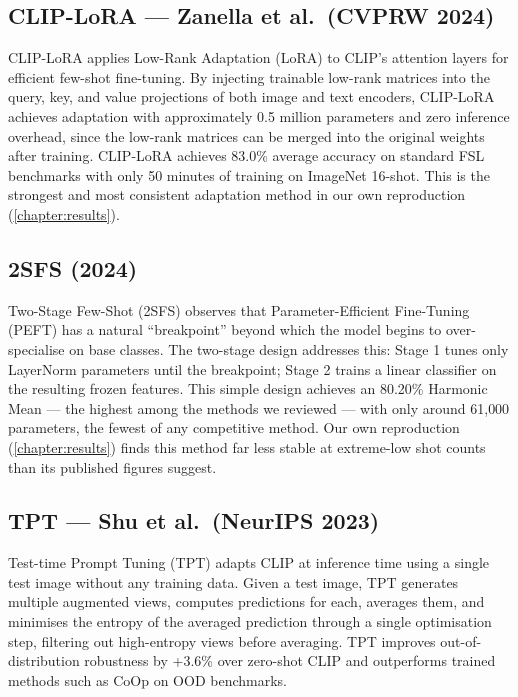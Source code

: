 \documentclass{iutbscthesis}
\begin{document}
\subsection{CLIP-LoRA --- Zanella et al.\ (CVPRW 2024)}
CLIP-LoRA \cite{zanella2024cliplora} applies Low-Rank Adaptation (LoRA) to CLIP's attention layers for efficient few-shot fine-tuning. By injecting trainable low-rank matrices into the query, key, and value projections of both image and text encoders, CLIP-LoRA achieves adaptation with approximately 0.5 million parameters and zero inference overhead, since the low-rank matrices can be merged into the original weights after training. CLIP-LoRA achieves 83.0\% average accuracy on standard FSL benchmarks with only 50 minutes of training on ImageNet 16-shot. This is the strongest and most consistent adaptation method in our own reproduction (\autoref{chapter:results}).

\subsection{2SFS (2024)}
Two-Stage Few-Shot (2SFS) \cite{2sfs2024} observes that Parameter-Efficient Fine-Tuning (PEFT) has a natural ``breakpoint'' beyond which the model begins to over-specialise on base classes. The two-stage design addresses this: Stage 1 tunes only LayerNorm parameters until the breakpoint; Stage 2 trains a linear classifier on the resulting frozen features. This simple design achieves an 80.20\% Harmonic Mean --- the highest among the methods we reviewed --- with only around 61{,}000 parameters, the fewest of any competitive method. Our own reproduction (\autoref{chapter:results}) finds this method far less stable at extreme-low shot counts than its published figures suggest.

\subsection{TPT --- Shu et al.\ (NeurIPS 2023)}
Test-time Prompt Tuning (TPT) \cite{shu2023tpt} adapts CLIP at inference time using a single test image without any training data. Given a test image, TPT generates multiple augmented views, computes predictions for each, averages them, and minimises the entropy of the averaged prediction through a single optimisation step, filtering out high-entropy views before averaging. TPT improves out-of-distribution robustness by +3.6\% over zero-shot CLIP and outperforms trained methods such as CoOp on OOD benchmarks.
\end{document}
